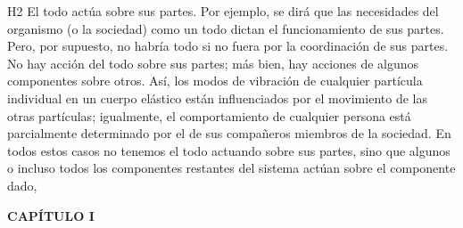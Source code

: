 {H2 El todo actúa sobre sus partes. Por ejemplo, se dirá que las necesidades del organismo (o la sociedad) como un todo dictan el funcionamiento de sus partes. 
Pero, por supuesto, no habría todo si no fuera por la coordinación de sus partes. No hay acción del todo sobre sus partes; más bien, hay acciones de algunos componentes sobre otros. 
Así, los modos de vibración de cualquier partícula individual en un cuerpo elástico están influenciados por el movimiento de las otras partículas; igualmente, el comportamiento de cualquier persona está parcialmente determinado por el de sus compañeros miembros de la sociedad. 
En todos estos casos no tenemos el todo actuando sobre sus partes, sino que algunos o incluso todos los componentes restantes del sistema actúan sobre el componente dado,
}

\newpage
\fancyhf{}
\fancyhead[l]{\thepage}
\begin{center}
{\fontsize{16}{18}\selectfont \textbf{CAPÍTULO I}}
\end{center}
\vspace{0.5cm}

